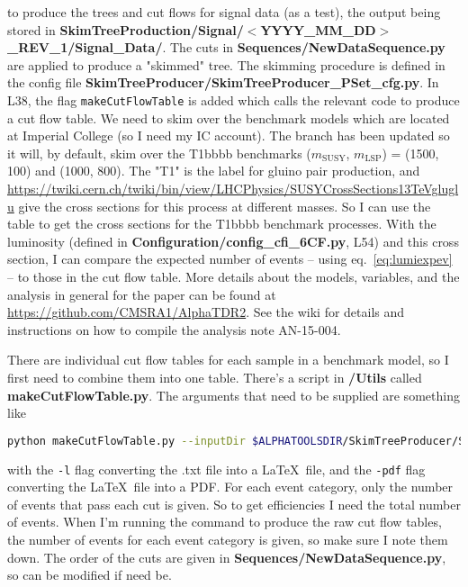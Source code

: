 to produce the trees and cut flows for signal data (as a test), the output being stored in \textbf{SkimTreeProduction/Signal/$<$YYYY\_MM\_DD$>$\_REV\_1/Signal\_Data/}. The cuts in \textbf{Sequences/NewDataSequence.py} are applied to produce a "skimmed" tree. The skimming procedure is defined in the config file \textbf{SkimTreeProducer/SkimTreeProducer\_PSet\_cfg.py}. In L38, the flag \texttt{makeCutFlowTable} is added which calls the relevant code to produce a cut flow table. We need to skim over the benchmark models which are located at Imperial College (so I need my IC account). The branch has been updated so it will, by default, skim over the T1bbbb benchmarks ($m_{\mathrm{SUSY}}$, $m_{\mathrm{LSP}}$) = (1500, 100) and (1000, 800). The "T1" is the label for gluino pair production, and \url{https://twiki.cern.ch/twiki/bin/view/LHCPhysics/SUSYCrossSections13TeVgluglu} give the cross sections for this process at different masses. So I can use the table to get the cross sections for the T1bbbb benchmark processes. With the luminosity (defined in \textbf{Configuration/config\_cfi\_6CF.py}, L54) and this cross section, I can compare the expected number of events -- using eq.~\ref{eq:lumiexpev} -- to those in the cut flow table. More details about the models, variables, and the analysis in general for the paper can be found at \url{https://github.com/CMSRA1/AlphaTDR2}. See the wiki for details and instructions on how to compile the analysis note AN-15-004.

There are individual cut flow tables for each sample in a benchmark model, so I first need to combine them into one table. There's a script in \textbf{/Utils} called \textbf{makeCutFlowTable.py}. The arguments that need to be supplied are something like

\begin{lstlisting}[belowskip=-0.7cm, language=sh, numbers=none]
python makeCutFlowTable.py --inputDir $ALPHATOOLSDIR/SkimTreeProducer/SkimTreeProduction/Signal/2017_01_25_REV_1/Signal_Data/ --process Signal_Run2015D_25ns -l -pdf
\end{lstlisting}

with the \texttt{-l} flag converting the .txt file into a \LaTeX\ file, and the \texttt{-pdf} flag converting the \LaTeX\ file into a PDF. For each event category, only the number of events that pass each cut is given. So to get efficiencies I need the total number of events. When I'm running the command to produce the raw cut flow tables, the number of events for each event category is given, so make sure I note them down. The order of the cuts are given in \textbf{Sequences/NewDataSequence.py}, so can be modified if need be.


